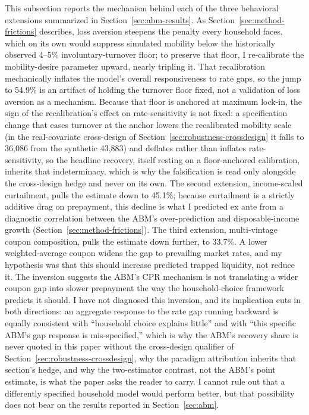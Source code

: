\documentclass[12pt]{article}
\begin{document}
This subsection reports the mechanism behind each of the three behavioral extensions summarized in Section~\ref{sec:abm-results}. As Section~\ref{sec:method-frictions} describes, loss aversion steepens the penalty every household faces, which on its own would suppress simulated mobility below the historically observed 4--5\% involuntary-turnover floor; to preserve that floor, I re-calibrate the mobility-desire parameter upward, nearly tripling it. That recalibration mechanically inflates the model's overall responsiveness to rate gaps, so the jump to 54.9\% is an artifact of holding the turnover floor fixed, not a validation of loss aversion as a mechanism. Because that floor is anchored at maximum lock-in, the sign of the recalibration's effect on rate-sensitivity is not fixed: a specification change that eases turnover at the anchor lowers the recalibrated mobility scale (in the real-covariate cross-design of Section~\ref{sec:robustness-crossdesign} it falls to 36,086 from the synthetic 43,883) and deflates rather than inflates rate-sensitivity, so the headline recovery, itself resting on a floor-anchored calibration, inherits that indeterminacy, which is why the falsification is read only alongside the cross-design hedge and never on its own. The second extension, income-scaled curtailment, pulls the estimate down to 45.1\%; because curtailment is a strictly additive drag on prepayment, this decline is what I predicted ex ante from a diagnostic correlation between the ABM's over-prediction and disposable-income growth (Section~\ref{sec:method-frictions}). The third extension, multi-vintage coupon composition, pulls the estimate down further, to 33.7\%. A lower weighted-average coupon widens the gap to prevailing market rates, and my hypothesis was that this should increase predicted trapped liquidity, not reduce it. The inversion suggests the ABM's CPR mechanism is not translating a wider coupon gap into slower prepayment the way the household-choice framework predicts it should. I have not diagnosed this inversion, and its implication cuts in both directions: an aggregate response to the rate gap running backward is equally consistent with ``household choice explains little'' and with ``this specific ABM's gap response is mis-specified,'' which is why the ABM's recovery share is never quoted in this paper without the cross-design qualifier of Section~\ref{sec:robustness-crossdesign}, why the paradigm attribution inherits that section's hedge, and why the two-estimator contrast, not the ABM's point estimate, is what the paper asks the reader to carry. I cannot rule out that a differently specified household model would perform better, but that possibility does not bear on the results reported in Section~\ref{sec:abm}.
\end{document}
